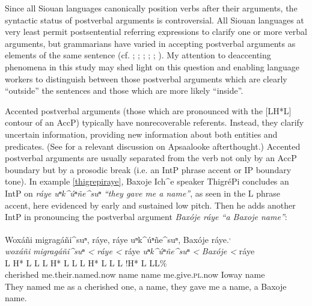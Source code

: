 \documentclass[output=paper]{LSP/langsci}
\begin{document}
Since all Siouan languages canonically position verbs after their arguments, the syntactic status of postverbal arguments is controversial. All Siouan languages at very least permit postsentential referring expressions to clarify one or more verbal arguments, but grammarians have varied in accepting postverbal arguments as elements of the same sentence (cf. \citealt{Rudin1998}; \citealt{Mithun1999}; \citealt[76]{Ingham2003}; \citealt[421]{Cumberland2005}; \citealt[292--293]{Boyle2007}; \citealt{Gordon2008}). My attention to deaccenting phenomena in this study may shed light on this question and enabling language workers to distinguish between those postverbal arguments which are clearly “outside” the sentences and those which are more likely “inside”.

Accented postverbal arguments (those which are pronounced with the [LH*L] contour of an AccP) typically have nonrecoverable referents. Instead, they clarify uncertain information, providing new information about both entities and predicates. (See \citealt[103]{Graczyk1991a} for a relevant discussion on Apsaalooke afterthought.) Accented postverbal arguments are usually separated from the verb not only by an AccP boundary but by a prosodic break (i.e. an IntP phrase accent or IP boundary tone). In example \ref{thigrepiraye}, Baxoje Ich\^{}e speaker ThigréPi concludes an IntP on \emph{ráye uⁿk\^{}úⁿñe\^{}suⁿ “they gave me a name”}, as seen in the L phrase accent, here evidenced by early and sustained low pitch. Then he adds another IntP in pronouncing the postverbal argument \emph{Baxóje ráye “a Baxoje name”}:

\ea\label{thigrepiraye}
Woxáñi migragáñi\^{}suⁿ, ráye, ráye uⁿk\^{}úⁿñe\^{}suⁿ, Baxóje ráye.\footnotemark\textsuperscript{,} \footnotemark\\
\glll	\emph{woxáñi} 	\emph{migragáñi\^{}suⁿ <}		\emph{ráye <}	ráye		\emph{uⁿk\^{}úⁿñe\^{}suⁿ <}	\emph{Baxóje <}		ráye\\
	{\ob L H* L}		{L\cb}	{\ob L H* L L\cb}	{\ob L H* L}	{L\cb}	{\ob L !H* L} 		{L\cb{}L\%}\\
	cherished	me.their.named.now	name		name	me.give.\textsc{pl}.now	Ioway			name\\
\glt	They named me as a cherished one, a name, they gave me a name, a Baxoje name.
\z
\end{document}

